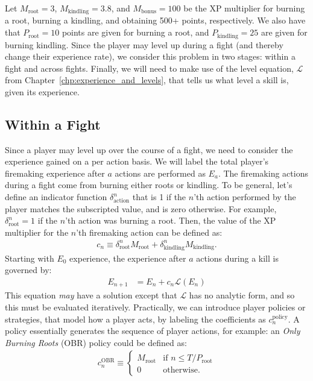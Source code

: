 	Let $M_\text{root}=3$, $M_\text{kindling}=3.8$, and $M_\text{bonus}=100$ be the XP multiplier for burning a root, burning a kindling, and obtaining 500+ points, respectively. We also have that $P_\text{root}=10$ points are given for burning a root, and $P_\text{kindling}=25$ are given for burning kindling. Since the player may level up during a fight (and thereby change their experience rate), we consider this problem in two stages: within a fight and across fights. Finally, we will need to make use of the level equation, $\mathcal{L}$ from Chapter~\ref{chp:experience_and_levels}, that tells us what level a skill is, given its experience.

	\subsection{Within a Fight}
		Since a player may level up over the course of a fight, we need to consider the experience gained on a per action basis. We will label the total player's firemaking experience after $a$ actions are performed as $E_a$. The firemaking actions during a fight come from burning either roots or kindling. To be general, let's define an indicator function $\delta^n_\text{action}$ that is 1 if the $n$'th action performed by the player matches the subscripted value, and is zero otherwise. For example, $\delta^n_\text{root}=1$ if the $n$'th action was burning a root. Then, the value of the XP multiplier for the $n$'th firemaking action can be defined as:
		\begin{align}
			c_n \equiv \delta_\text{root}^n M_\text{root} + \delta_\text{kindling}^n M_\text{kindling}.
		\end{align}
		Starting with $E_0$ experience, the experience after $a$ actions during a kill is governed by:
		\begin{align}
			E_{n+1} &= E_{n} + c_n\mathcal{L}(E_{n})
		\end{align}
		This equation \emph{may} have a solution except that $\mathcal{L}$ has no analytic form, and so this must be evaluated iteratively. Practically, we can introduce player policies or strategies, that model how a player acts, by labeling the coefficients as $c_n^\text{policy}$. A policy essentially generates the sequence of player actions, for example: an \emph{Only Burning Roots} (OBR) policy could be defined as:
		\begin{align}
			c_n^\text{OBR} \equiv \begin{cases}
				M_\text{root} & \text{if } n \le T/P_\text{root}\\
				0 & \text{otherwise}.
			\end{cases}
		\end{align}
